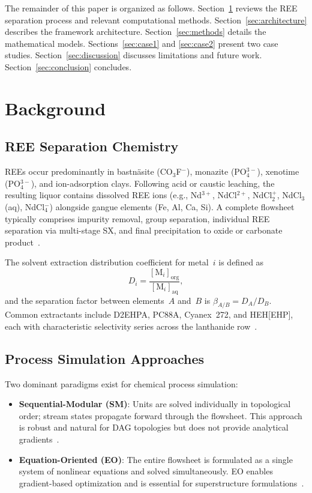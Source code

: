 \documentclass[11pt]{article}
\begin{document}
The remainder of this paper is organized as follows.
Section~\ref{sec:background} reviews the REE separation process and
relevant computational methods.  Section~\ref{sec:architecture} describes
the framework architecture.  Section~\ref{sec:methods} details the
mathematical models.  Sections~\ref{sec:case1} and \ref{sec:case2}
present two case studies.  Section~\ref{sec:discussion} discusses
limitations and future work.  Section~\ref{sec:conclusion} concludes.


\section{Background}\label{sec:background}

\subsection{REE Separation Chemistry}

REEs occur predominantly in bastn\"asite (CO$_3$F$^-$), monazite
(PO$_4^{3-}$), xenotime (PO$_4^{3-}$), and ion-adsorption clays.
Following acid or caustic leaching, the resulting liquor contains dissolved
REE ions (e.g., Nd$^{3+}$, NdCl$^{2+}$, NdCl$_2^+$, NdCl$_3$(aq),
NdCl$_4^-$) alongside gangue elements (Fe, Al, Ca, Si).  A complete
flowsheet typically comprises impurity removal, group separation, individual
REE separation via multi-stage SX, and final precipitation to oxide or
carbonate product~\citep{xie2014critical}.

The solvent extraction distribution coefficient for metal~$i$ is defined as
\begin{equation}\label{eq:D}
  D_i = \frac{[\text{M}_i]_{\text{org}}}{[\text{M}_i]_{\text{aq}}},
\end{equation}
and the separation factor between elements~$A$ and~$B$ is
$\beta_{A/B} = D_A / D_B$.  Common extractants include D2EHPA, PC88A,
Cyanex~272, and HEH[EHP], each with characteristic selectivity series
across the lanthanide row~\citep{xie2014critical}.

\subsection{Process Simulation Approaches}

Two dominant paradigms exist for chemical process simulation:
\begin{itemize}
  \item \textbf{Sequential-Modular (SM)}: Units are solved individually in
    topological order; stream states propagate forward through the
    flowsheet.  This approach is robust and natural for DAG topologies but
    does not provide analytical gradients~\citep{westerberg1979review}.
  \item \textbf{Equation-Oriented (EO)}: The entire flowsheet is
    formulated as a single system of nonlinear equations and solved
    simultaneously.  EO enables gradient-based optimization and is
    essential for superstructure formulations~\citep{biegler2010nonlinear}.
\end{itemize}
\end{document}

